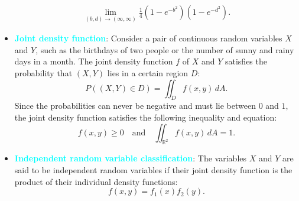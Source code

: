 \documentclass{report}
\begin{document}
\begin{itemize}
            \begin{align*}
                \lim\limits_{(b,d) \to (\infty,\infty)}{\frac{1}{4}(1-e^{-b^{2}})(1-e^{-d^{2}})}
            .\end{align*}
        \item \textbf{\textcolor{cyan}{Joint density function}}:
            Consider a pair of continuous random variables \(X\) and \(Y\), such as the birthdays of two people or the number of sunny and rainy days in a month. The joint density function \(f\) of \(X\) and \(Y\) satisfies the probability that \((X,Y)\) lies in a certain region \(D\):
            \[
                P((X,Y) \in D) = \iint_D f(x,y) \, dA.
            \]
            Since the probabilities can never be negative and must lie between \(0\) and \(1\), the joint density function satisfies the following inequality and equation:
            \[
                f(x,y) \geq 0 \quad \text{and} \quad \iint_{\mathbb{R}^2} f(x,y) \, dA = 1.
            \]
        \item \textbf{\textcolor{cyan}{Independent random variable classification}}:
            The variables \(X\) and \(Y\) are said to be independent random variables if their joint density function is the product of their individual density functions:
            \[
                f(x,y) = f_1(x) f_2(y).
            \]


\end{itemize}
\end{document}
